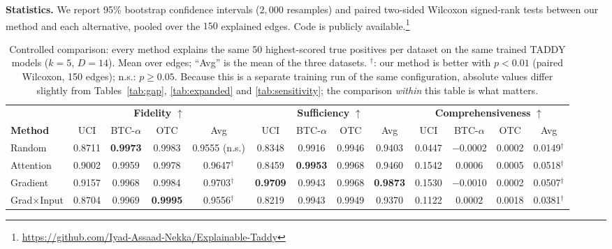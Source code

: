 \documentclass[conference]{IEEEtran}
\begin{document}
\noindent\textbf{Statistics.} We report 95\% bootstrap confidence intervals
($2{,}000$ resamples) and paired two-sided Wilcoxon signed-rank tests
\cite{wilcoxon1945} between our method and each alternative, pooled over the
$150$ explained edges. Code is publicly available.\footnote{\url{https://github.com/Iyad-Assaad-Nekka/Explainable-Taddy}}

\begin{table}[!t]
\centering
\caption{Controlled comparison: every method explains the same 50
highest-scored true positives per dataset on the same trained TADDY models
($k{=}5$, $D{=}14$). Mean over edges; ``Avg'' is the mean of the three datasets.
$^{\dagger}$: our method is better with $p<0.01$ (paired Wilcoxon, 150 edges);
n.s.: $p\ge0.05$. Because this is a separate training run of the same
configuration, absolute values differ slightly from Tables~\ref{tab:gap},
\ref{tab:expanded} and \ref{tab:sensitivity}; the comparison \emph{within} this
table is what matters.}
\label{tab:baselines}
\footnotesize
\setlength{\tabcolsep}{4.2pt}
\begin{tabular}{l cccc cccc cccc}
\toprule
& \multicolumn{4}{c}{\textbf{Fidelity} $\uparrow$}
& \multicolumn{4}{c}{\textbf{Sufficiency} $\uparrow$}
& \multicolumn{4}{c}{\textbf{Comprehensiveness} $\uparrow$} \\
\cmidrule(lr){2-5}\cmidrule(lr){6-9}\cmidrule(lr){10-13}
\textbf{Method} & UCI & BTC-$\alpha$ & OTC & Avg
& UCI & BTC-$\alpha$ & OTC & Avg
& UCI & BTC-$\alpha$ & OTC & Avg \\
\midrule
Random            & 0.8711 & \textbf{0.9973} & 0.9983 & 0.9555 (n.s.)
                  & 0.8348 & 0.9916 & 0.9946 & 0.9403
                  & 0.0447 & $-$0.0002 & 0.0002 & 0.0149$^{\dagger}$ \\
Attention \cite{jain2019attention}
                  & 0.9002 & 0.9959 & 0.9978 & 0.9647$^{\dagger}$
                  & 0.8459 & \textbf{0.9953} & 0.9968 & 0.9460
                  & 0.1542 & 0.0006 & 0.0005 & 0.0518$^{\dagger}$ \\
Gradient \cite{simonyan2014saliency}
                  & 0.9157 & 0.9968 & 0.9984 & 0.9703$^{\dagger}$
                  & \textbf{0.9709} & 0.9943 & 0.9968 & \textbf{0.9873}
                  & 0.1530 & $-$0.0010 & 0.0002 & 0.0507$^{\dagger}$ \\
Grad$\times$Input \cite{shrikumar2017deeplift}
                  & 0.8704 & 0.9969 & \textbf{0.9995} & 0.9556$^{\dagger}$
                  & 0.8219 & 0.9943 & 0.9949 & 0.9370
                  & 0.1122 & 0.0002 & 0.0018 & 0.0381$^{\dagger}$ \\

\end{tabular}
\end{table}
\end{document}
